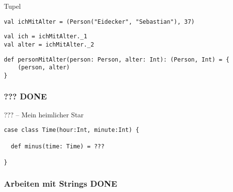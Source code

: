\documentclass[14pt,aspectratio=169,trans]{beamer} %
\begin{document}
\begin{frame}[fragile]{}
 \begin{block}{Tupel}
\scriptsize
	\onslide<2->
  \begin{lstlisting}
val ichMitAlter = (Person("Eidecker", "Sebastian"), 37)

	\end{lstlisting}
  \begin{lstlisting}[firstnumber=2]
val ich = ichMitAlter._1
val alter = ichMitAlter._2

	\end{lstlisting}	
  \begin{lstlisting}[firstnumber=4]
def personMitAlter(person: Person, alter: Int): (Person, Int) = {
	(person, alter)
}
\end{lstlisting}
\end{block}
\end{frame}

\subsubsection*{??? DONE}

\begin{frame}[fragile]{}
 \begin{block}{??? -- Mein heimlicher Star}
\scriptsize
	\onslide<2->
  \begin{lstlisting}
case class Time(hour:Int, minute:Int) {

  def minus(time: Time) = ???
	
}
	\end{lstlisting}
\end{block}
\end{frame}

\subsubsection*{Arbeiten mit Strings DONE}
\end{document}
